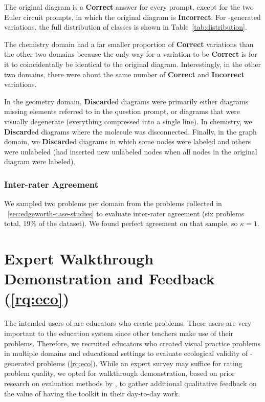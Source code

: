 The original diagram is a \textbf{Correct} answer for every prompt, except for the two Euler circuit prompts, in which the original diagram is \textbf{Incorrect}. For \Edgeworth-generated variations, the full distribution of classes is shown in Table~\ref{tab:distribution}.

The chemistry domain had a far smaller proportion of \textbf{Correct} variations than the other two domains because the only way for a variation to be \textbf{Correct} is for it to coincidentally be identical to the original diagram. Interestingly, in the other two domains, there were about the same number of \textbf{Correct} and \textbf{Incorrect} variations.

In the geometry domain, \textbf{Discard}ed diagrams were primarily either diagrams missing elements referred to in the question prompt, or diagrams that were visually degenerate (\eg everything compressed into a single line). In chemistry, we \textbf{Discard}ed diagrams where the molecule was disconnected. Finally, in the graph domain, we \textbf{Discard}ed diagrams in which some nodes were labeled and others were unlabeled (\ie \Edgeworth had inserted new unlabeled nodes when all nodes in the original diagram were labeled).

\subsubsection{Inter-rater Agreement}

We sampled two problems per domain from the problems collected in ~\cref{sec:edgeworth-case-studies} to evaluate inter-rater agreement (six problems total, 19\% of the dataset). We found perfect agreement on that sample, so $\kappa = 1$.


\section{Expert Walkthrough Demonstration and Feedback (\ref{rq:eco})}
\label{sec:expert-feedback}

The intended users of \Edgeworth are educators who create problems. These users are very important to the education system since other teachers make use of their problems. Therefore, we recruited educators who created visual practice problems in multiple domains and educational settings to evaluate ecological validity of \Edgeworth-generated problems (\ref{rq:eco}). While an expert survey may suffice for rating problem quality, we opted for walkthrough demonstration, based on prior research on evaluation methods by \citet{Ledo2018EvaluationResearch}, to gather additional qualitative feedback on the value of having the toolkit in their day-to-day work.

